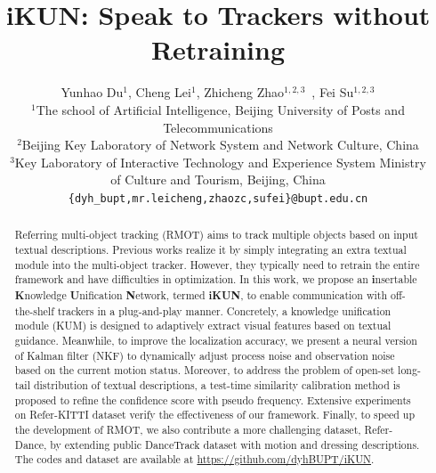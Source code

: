 \documentclass[10pt,twocolumn,letterpaper]{article}
\begin{document}
\title{iKUN: Speak to Trackers without Retraining}

\author{Yunhao Du$^{1}$, Cheng Lei$^{1}$, Zhicheng Zhao$^{1,2,3}$\footnotemark[1]\ , Fei Su$^{1,2,3}$\\
$^1$The school of Artificial Intelligence, Beijing University of Posts and Telecommunications \\
$^2$Beijing Key Laboratory of Network System and Network Culture, China\\
$^3$Key Laboratory of Interactive Technology and Experience System Ministry \\of Culture and Tourism, Beijing, China\\
{\tt\small \{dyh\_bupt,mr.leicheng,zhaozc,sufei\}@bupt.edu.cn} \\
}
\maketitle
\renewcommand{\thefootnote}{\fnsymbol{footnote}}

\maketitle

\begin{abstract}
    Referring multi-object tracking (RMOT) aims to track multiple objects based on input textual descriptions.
    Previous works realize it by simply integrating an extra textual module into the multi-object tracker.
    However, they typically need to retrain the entire framework and have difficulties in optimization.
    In this work, we propose an \textbf{i}nsertable \textbf{K}nowledge \textbf{U}nification \textbf{N}etwork, termed \textbf{iKUN}, 
    to enable communication with off-the-shelf trackers in a plug-and-play manner.
    Concretely, a knowledge unification module (KUM) is designed to adaptively extract visual features based on textual guidance.
    Meanwhile, to improve the localization accuracy, 
    we present a neural version of Kalman filter (NKF) to dynamically adjust process noise and observation noise based on the current motion status.
    Moreover, to address the problem of open-set long-tail distribution of textual descriptions, 
    a test-time similarity calibration method is proposed to refine the confidence score with pseudo frequency.
    Extensive experiments on Refer-KITTI dataset verify the effectiveness of our framework.
    Finally, to speed up the development of RMOT, we also contribute a more challenging dataset, Refer-Dance, 
    by extending public DanceTrack dataset with motion and dressing descriptions.
    The codes and dataset are available at \url{https://github.com/dyhBUPT/iKUN}.
\end{abstract}
\end{document}
